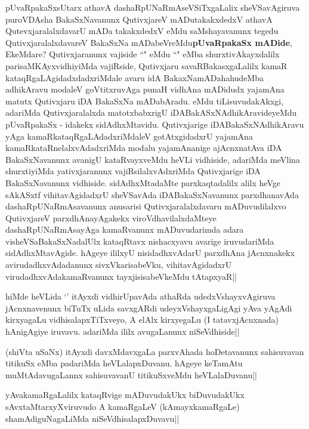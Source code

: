\begin{artha}
pUvaRpakaSxsUtarx athavA dashaRpUNaRmAseVSiTxgaLalix sheVSavAgiruva puroVDAsha BakaSxNavanunx QutivxjareV mADutakakxdedxV athavA QutevxjaralalxdavarU mADa takakxdedxV eMdu saMshayavanunx tegedu QutivxjaralalxdavareV BakaSxNa mADabeVreMdu\textbf{pUvaRpakaSx mADide}, EkeMdare? Qutivxjaranunx vajiside ``\stext" eMdu ``\stext" eMba shurxtivAkayxdalilx parisaMKAyxvidhiyiMda vajiRside, Qutivxjaru savaRBakasxgaLalilx kamaR kataqRgaLAgidadxdadxriMdale avaru idA BakaxNamADahahudeMba adhikAravu modaleV goVtitxruvAga punaH vidhAna mADidudx yajamAna matutx Qutivxjaru iDA BakaSxNa mADabAradu.
eMdu tiLisuvudakAkxgi, adariMda Qutivxjaralalxda matotxbabxrigU iDABakASxNAdhikAravideyeMdu pUvaRpakaSx - idakekx sidAdhxMtavidu. Qutivxjarige iDABakaSxNAdhikAravu yAga kamaRkataqRgaLAdadxriMdaleV gotAtxgidadxrU yajamAna kamaRkataRnelalxvAdadxriMda modalu yajamAnanige ajAcnxnatAva iDA BakaSxNavanunx avanigU kataRvayxveMdu heVLi vidhiside, adariMda meVlina shurxtiyiMda yativxjaranunx vajiRsilalxvAdxriMda Qutivxjarige iDA BakaSxNavanunx vidhiside. sidAdhxMtadaMte parxkaqtadalilx alilx heVge sAkASxtf vihitavAgidadxrU sheVSavAda iDABakaSxNavanunx parxdhanavAda dashaRpUNaRmAsavanunx anusarisi Qutivxjaralalxdavaru mADuvudilalxvo QutivxjareV parxdhAnayAgakekx viroVdhavilalxdaMteye dashaRpUNaRmAsayAga kamaRvanunx mADuvudarimda adara visheVSaBakaSxNadalUlx kataqRtavx nishacxyavu avarige iruvudariMda sidAdhxMtavAgide. hAgeye ililxyU nisidadhxvAdarU parxdhAna jAcnxnakekx avirudadhxvAdadanunx sivxVkarisabeVku, vihitavAgidadxrU virudadhxvAdakamaRvanunx tayxjisisabeVkeMdu tAtapxyaR||
\end{artha}

\begin{artha}
hiMde heVLida `\stext'  itAyxdi vidhirUpavAda athaRda udedxVshayxvAgiruva jAcnxnavenunx biTuTx uLida savxgARdi udeyxVshayxgaLigAgi yAva yAgAdi kirxyagaLu vidhisalapxTiTxveyo, A elAlx kirxyegaLu (I tatavxjAcnxnada) hAnigAgiye iruvavu. adariMda ililx avugaLanunx niSeVdhiside||
\end{artha}


\begin{artha}
(shiVta uSaNx) itAyxdi davxMdavxgaLa parxvAhada hoDetavanunx sahisuvavan titikuSx eMba padariMda heVLalapxDuvanu. hAgeye keTamAtu muMtAdavugaLannx sahisuvavanU titikuSxveMdu heVLalaDuvanu||
\end{artha}

\begin{artha}
yAvakamaRgaLalilx kataqRvige mADuvudakUkx biDuvudakUkx sAvxtaMtarxyXviruvudo A kamaRgaLeV (kAmayxkamaRgaLe) shamAdiguNagaLiMda niSeVdhisalapxDuvavu||
\end{artha}

